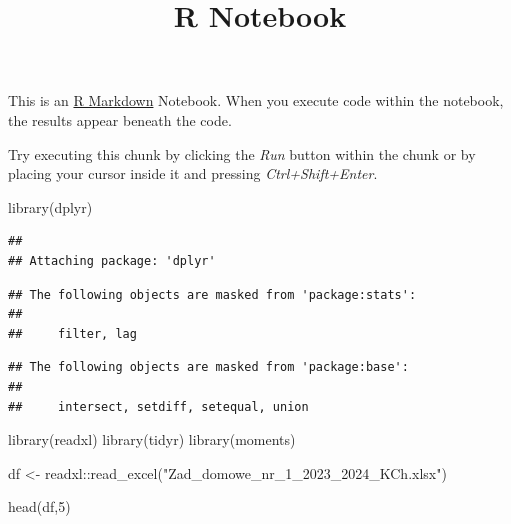\documentclass[]{article}
\title{R Notebook}
\author{}
\date{}
\newenvironment{Shaded}{\begin{snugshade}}{\end{snugshade}}
\newcommand{\DecValTok}[1]{\textcolor[rgb]{0.00,0.00,0.81}{#1}}
\newcommand{\FunctionTok}[1]{\textcolor[rgb]{0.00,0.00,0.00}{#1}}
\newcommand{\NormalTok}[1]{#1}
\newcommand{\OtherTok}[1]{\textcolor[rgb]{0.56,0.35,0.01}{#1}}
\newcommand{\SpecialCharTok}[1]{\textcolor[rgb]{0.00,0.00,0.00}{#1}}
\newcommand{\StringTok}[1]{\textcolor[rgb]{0.31,0.60,0.02}{#1}}
\begin{document}
\maketitle

This is an \href{http://rmarkdown.rstudio.com}{R Markdown} Notebook.
When you execute code within the notebook, the results appear beneath
the code.

Try executing this chunk by clicking the \emph{Run} button within the
chunk or by placing your cursor inside it and pressing
\emph{Ctrl+Shift+Enter}.

\begin{Shaded}
\begin{Highlighting}[]
\FunctionTok{library}\NormalTok{(dplyr)}
\end{Highlighting}
\end{Shaded}

\begin{verbatim}
## 
## Attaching package: 'dplyr'
\end{verbatim}

\begin{verbatim}
## The following objects are masked from 'package:stats':
## 
##     filter, lag
\end{verbatim}

\begin{verbatim}
## The following objects are masked from 'package:base':
## 
##     intersect, setdiff, setequal, union
\end{verbatim}

\begin{Shaded}
\begin{Highlighting}[]
\FunctionTok{library}\NormalTok{(readxl)}
\FunctionTok{library}\NormalTok{(tidyr)}
\FunctionTok{library}\NormalTok{(moments)}
\end{Highlighting}
\end{Shaded}

\begin{Shaded}
\begin{Highlighting}[]
\NormalTok{df }\OtherTok{\textless{}{-}}\NormalTok{ readxl}\SpecialCharTok{::}\FunctionTok{read\_excel}\NormalTok{(}\StringTok{"Zad\_domowe\_nr\_1\_2023\_2024\_KCh.xlsx"}\NormalTok{)}
\end{Highlighting}
\end{Shaded}

\begin{Shaded}
\begin{Highlighting}[]
\FunctionTok{head}\NormalTok{(df,}\DecValTok{5}\NormalTok{)}
\end{Highlighting}
\end{Shaded}
\end{document}
